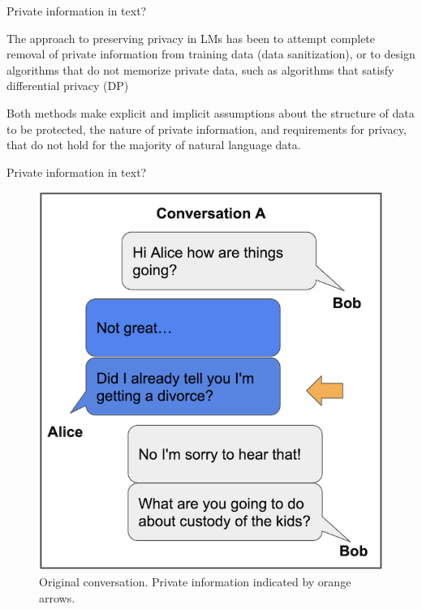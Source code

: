 \documentclass[12pt,aspectratio=169,handout]{beamer}
\begin{document}
\begin{frame}{Private information in text?}

The approach to preserving privacy in LMs has been to attempt complete removal of private information from training data (data sanitization), or to design algorithms that do not memorize private data, such as algorithms that satisfy differential privacy (DP)

Both methods make explicit and implicit assumptions about the structure of data to be protected, the nature of private information, and requirements for privacy, that do not hold for the majority of natural language data.


\end{frame}



\begin{frame}{Private information in text?}

\begin{figure}
\includegraphics[width=0.45\linewidth]{img/out1.png}
\caption{Original conversation. Private information indicated by orange arrows.}
\end{figure}



\end{frame}
\end{document}

